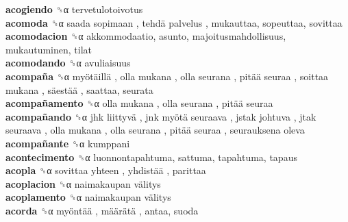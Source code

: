 \textbf{acogiendo} ␝α  tervetulotoivotus  \\
\textbf{acomoda} ␝α   saada sopimaan ,  tehdä palvelus , mukauttaa, sopeuttaa, sovittaa  \\
\textbf{acomodacion} ␝α  akkommodaatio, asunto, majoitusmahdollisuus, mukautuminen, tilat  \\
\textbf{acomodando} ␝α  avuliaisuus  \\
\textbf{acompaña} ␝α   myötäillä ,  olla mukana ,  olla seurana ,  pitää seuraa ,  soittaa mukana ,  säestää , saattaa, seurata  \\
\textbf{acompañamento} ␝α   olla mukana ,  olla seurana ,  pitää seuraa   \\
\textbf{acompañando} ␝α   jhk liittyvä ,  jnk myötä seuraava ,  jstak johtuva ,  jtak seuraava ,  olla mukana ,  olla seurana ,  pitää seuraa ,  seurauksena oleva   \\
\textbf{acompañante} ␝α  kumppani  \\
\textbf{acontecimento} ␝α  luonnontapahtuma, sattuma, tapahtuma, tapaus  \\
\textbf{acopla} ␝α   sovittaa yhteen ,  yhdistää , parittaa  \\
\textbf{acoplacion} ␝α   naimakaupan välitys   \\
\textbf{acoplamento} ␝α   naimakaupan välitys   \\
\textbf{acorda} ␝α   myöntää ,  määrätä , antaa, suoda  \\
